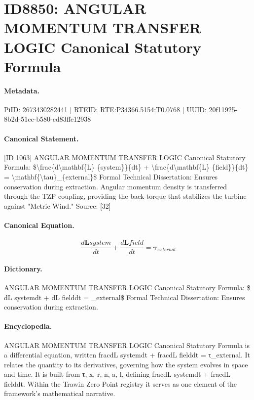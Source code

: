 \section*{ID8850: ANGULAR MOMENTUM TRANSFER LOGIC Canonical Statutory Formula}
\paragraph{Metadata.}
PiID: 2673430282441 | RTEID: RTE:P34366.5154:T0.0768 | UUID: 20f11925-8b2d-51cc-b580-cd83ffe12938

\paragraph{Canonical Statement.}
[ID 1063] ANGULAR MOMENTUM TRANSFER LOGIC Canonical Statutory Formula: \$\textbackslash{}frac\{d\textbackslash{}mathbf\{L\} \{system\}\}\{dt\} + \textbackslash{}frac\{d\textbackslash{}mathbf\{L\} \{field\}\}\{dt\} = \textbackslash{}mathbf\{\textbackslash{}tau\}\_\{external\}\$ Formal Technical Dissertation: Ensures conservation during extraction. Angular momentum density is transferred through the TZP coupling, providing the back-torque that stabilizes the turbine against "Metric Wind." Source: [32]

\paragraph{Canonical Equation.}
\[
\frac{d\mathbf{L} {system}}{dt} + \frac{d\mathbf{L} {field}}{dt} = \mathbf{\tau}_{external}
\]

\paragraph{Dictionary.}
ANGULAR MOMENTUM TRANSFER LOGIC Canonical Statutory Formula: \$ dL systemdt + dL fielddt = \_external\$ Formal Technical Dissertation: Ensures conservation during extraction.

\paragraph{Encyclopedia.}
ANGULAR MOMENTUM TRANSFER LOGIC Canonical Statutory Formula is a differential equation, written fracdL systemdt + fracdL fielddt = τ\_external. It relates the quantity to its derivatives, governing how the system evolves in space and time. It is built from τ, x, r, n, a, l, defining fracdL systemdt + fracdL fielddt. Within the Trawin Zero Point registry it serves as one element of the framework's mathematical narrative.
